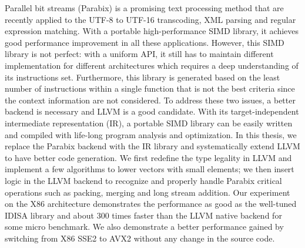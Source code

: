 
%
%


Parallel bit streams (Parabix) is a promising text processing method that are recently applied to the UTF-8 to UTF-16 transcoding, XML parsing and regular expression matching. With a portable high-performance SIMD library, it achieves good performance improvement in all these applications. However, this SIMD library is not perfect: with a uniform API, it still has to maintain different implementation for different architectures which requires a deep understanding of its instructions set. Furthermore, this library is generated based on the least number of instructions within a single function that is not the best criteria since the context information are not considered. To address these two issues, a better backend is necessary and LLVM is a good candidate. With its target-independent intermediate representation (IR), a portable SIMD library can be easily written and compiled with life-long program analysis and optimization. In this thesis, we replace the Parabix backend with the IR library and systematically extend LLVM to have better code generation. We first redefine the type legality in LLVM and implement a few algorithms to lower vectors with small elements; we then insert logic in the LLVM backend to recognize and properly handle Parabix critical operations such as packing, merging and long stream addition. Our experiment on the X86 architecture demonstrates the performance as good as the well-tuned IDISA library and about 300 times faster than the LLVM native backend for some micro benchmark. We also demonstrate a better performance gained by switching from X86 SSE2 to AVX2 without any change in the source code.

